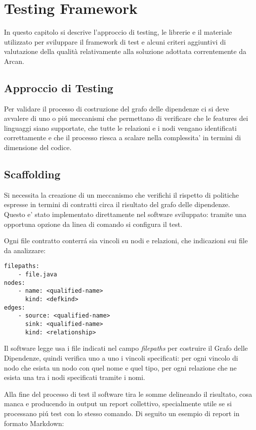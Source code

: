 \chapter{Testing Framework}

In questo capitolo si descrive l'approccio di testing, le librerie e il materiale utilizzato per sviluppare il framework di test e alcuni criteri aggiuntivi di valutazione della qualit\`a relativamente alla soluzione adottata correntemente da Arcan.

\section{Approccio di Testing}

Per validare il processo di costruzione del grafo delle dipendenze ci si deve avvalere di uno o pi\'u meccanismi che permettano di verificare che le features dei linguaggi siano supportate, che tutte le relazioni e i nodi vengano identificati correttamente e che il processo riesca a scalare nella complessita' in termini di dimensione del codice.

\section{Scaffolding}

Si necessita la creazione di un meccanismo che verifichi il rispetto di politiche espresse in termini di contratti circa il risultato del grafo delle dipendenze. Questo e' stato implementato direttamente nel software sviluppato: tramite una opportuna opzione da linea di comando si configura il test.

Ogni file contratto conterr\'a sia vincoli su nodi e relazioni, che indicazioni sui file da analizzare:

\begin{lstlisting}
filepaths:
    - file.java
nodes:
    - name: <qualified-name>
      kind: <defkind>
edges:
    - source: <qualified-name>
      sink: <qualified-name>
      kind: <relationship>
\end{lstlisting}

Il software legge usa i file indicati nel campo \emph{filepaths} per costruire il Grafo delle Dipendenze, quindi verifica uno a uno i vincoli specificati: per ogni vincolo di nodo che esista un nodo con quel nome e quel tipo, per ogni relazione che ne esista una tra i nodi specificati tramite i nomi.

Alla fine del processo di test il software tira le somme delineando il risultato, cosa manca e producendo in output un report collettivo, specialmente utile se si processano pi\'u test con lo stesso comando. Di seguito un esempio di report in formato Markdown:


